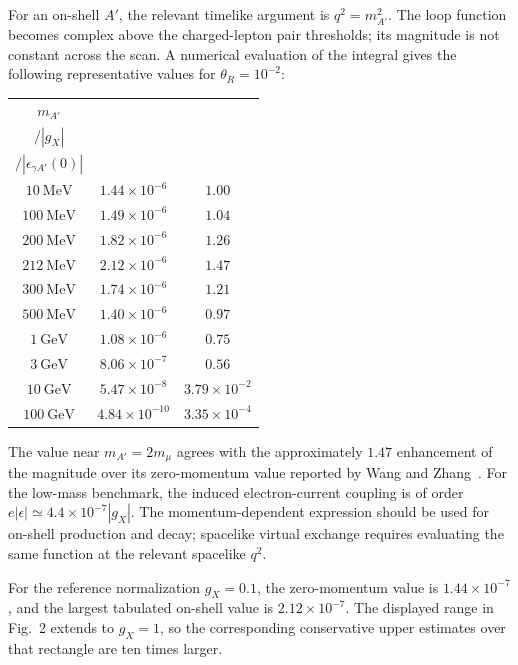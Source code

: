 \documentclass[12pt,a4paper]{article}
\begin{document}
For an on-shell \(A'\), the relevant timelike argument is \(q^2=m_{A'}^2\). The loop function becomes complex above the charged-lepton pair thresholds; its magnitude is not constant across the scan. A numerical evaluation of the integral gives the following representative values for \(\theta_R=10^{-2}\):
\begin{center}
\small
\begin{tabular}{c|c|c}
\(m_{A'}\) &
\shortstack{\(\left|\epsilon_{\gamma A'}(m_{A'}^2)\right|\)\\ \(/\left|g_X\right|\)} &
\shortstack{\(\left|\epsilon_{\gamma A'}(m_{A'}^2)\right|\)\\ \(/\left|\epsilon_{\gamma A'}(0)\right|\)}\\
\hline
\(10~\mathrm{MeV}\) & \(1.44\times10^{-6}\) & \(1.00\)\\
\(100~\mathrm{MeV}\) & \(1.49\times10^{-6}\) & \(1.04\)\\
\(200~\mathrm{MeV}\) & \(1.82\times10^{-6}\) & \(1.26\)\\
\(212~\mathrm{MeV}\) & \(2.12\times10^{-6}\) & \(1.47\)\\
\(300~\mathrm{MeV}\) & \(1.74\times10^{-6}\) & \(1.21\)\\
\(500~\mathrm{MeV}\) & \(1.40\times10^{-6}\) & \(0.97\)\\
\(1~\mathrm{GeV}\) & \(1.08\times10^{-6}\) & \(0.75\)\\
\(3~\mathrm{GeV}\) & \(8.06\times10^{-7}\) & \(0.56\)\\
\(10~\mathrm{GeV}\) & \(5.47\times10^{-8}\) & \(3.79\times10^{-2}\)\\
\(100~\mathrm{GeV}\) & \(4.84\times10^{-10}\) & \(3.35\times10^{-4}\)
\end{tabular}
\end{center}
The value near \(m_{A'}=2m_\mu\) agrees with the approximately \(1.47\) enhancement of the magnitude over its zero-momentum value reported by Wang and Zhang~\cite{Wang:2026supernova}. For the low-mass benchmark, the induced electron-current coupling is of order \(e|\epsilon|\simeq4.4\times10^{-7}|g_X|\). The momentum-dependent expression should be used for on-shell production and decay; spacelike virtual exchange requires evaluating the same function at the relevant spacelike \(q^2\).

For the reference normalization \(g_X=0.1\), the zero-momentum value is \(1.44\times10^{-7}\), and the largest tabulated on-shell value is \(2.12\times10^{-7}\). The displayed range in Fig.~2 extends to \(g_X=1\), so the corresponding conservative upper estimates over that rectangle are ten times larger.
\end{document}
